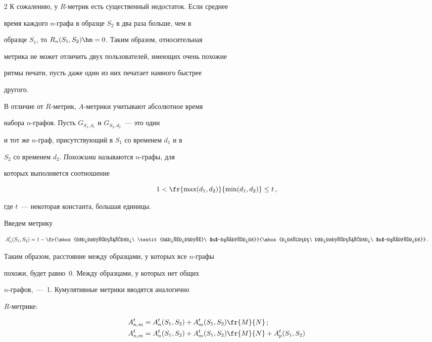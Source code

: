 \begin{multicols}{2}
К сожалению, у $R$-мет\-рик есть существенный недостаток. Если среднее

время каждого $n$-гра\-фа в образце $S_2$ в два раза больше, чем в

образце $S_1$, то $R_n(S_1, S_2) \hm= 0$. Таким образом, относительная

метрика не может отличить двух пользователей, имеющих очень похожие

ритмы печати, пусть даже один из них печатает намного быстрее

другого.



В отличие от $R$-метрик, $A$-мет\-ри\-ки учитывают абсолютное время

набора $n$-графов. Пусть $G_{S_1, d_1}$ и $G_{S_2, d_2}$~--- это один

и тот же $n$-граф, присутствующий в $S_1$ со временем $d_1$ и в

$S_2$ со временем $d_2$. \textit{Похожими} называются $n$-гра\-фы, для

которых выполняется соотношение

$$

1 < \fr{\max(d_1, d_2)}{\min(d_1,

d_2)} \le t\,,

$$

где $t$~--- некоторая константа, большая единицы.



Введем метрику

$$

A^t_n(S_1, S_2) = 1 - \fr{\mbox{количество\ \textit{похожих}\ $n$-графов}}

{\mbox{общее\ количество\ $n$-графов}}\,.

$$



Таким образом, расстояние между образцами, у которых все $n$-гра\-фы

похожи, будет равно~0. Между образцами, у которых нет общих

$n$-гра\-фов,~---~1. Кумулятивные метрики вводятся аналогично

$R$-мет\-рике:

\begin{align*}

A^t_{n, m} &= A^t_n(S_1, S_2) + A^t_m(S_1, S_2)  \fr{M}{N}\,;

\\

A^t_{n, m} &= A^t_n(S_1, S_2) + A^t_m(S_1, S_2)  \fr{M}{N} + A^t_p(S_1, S_2) 


\end{align*}
\end{multicols}
